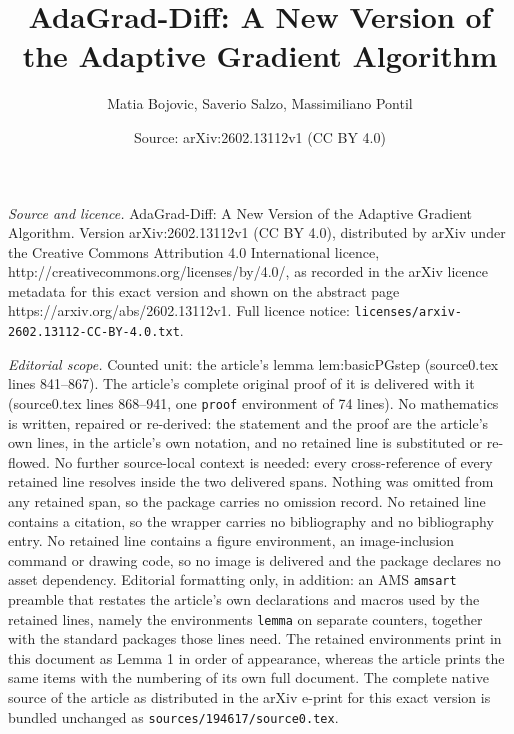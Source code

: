\documentclass[10pt,a4paper]{amsart}
\title{AdaGrad-Diff: A New Version of the Adaptive Gradient Algorithm}
\author{Matia Bojovic, Saverio Salzo, Massimiliano Pontil}
\date{Source: arXiv:2602.13112v1 (CC BY 4.0)}
\begin{document}
\maketitle

\noindent\emph{Source and licence.} AdaGrad-Diff: A New Version of the Adaptive Gradient Algorithm. Version arXiv:2602.13112v1 (CC BY 4.0), distributed by arXiv under the Creative Commons Attribution 4.0 International licence, http://creativecommons.org/licenses/by/4.0/, as recorded in the arXiv licence metadata for this exact version and shown on the abstract page https://arxiv.org/abs/2602.13112v1. Full licence notice: \texttt{licenses/arxiv-2602.13112-CC-BY-4.0.txt}.\par\smallskip

\noindent\textit{Editorial scope.} Counted unit: the article's lemma lem:basicPGstep (source0.tex lines 841--867). The article's complete original proof of it is delivered with it (source0.tex lines 868--941, one \texttt{proof} environment of 74 lines). No mathematics is written, repaired or re-derived: the statement and the proof are the article's own lines, in the article's own notation, and no retained line is substituted or re-flowed.  No further source-local context is needed: every cross-reference of every retained line resolves inside the two delivered spans.  Nothing was omitted from any retained span, so the package carries no omission record.  No retained line contains a citation, so the wrapper carries no bibliography and no bibliography entry.  No retained line contains a figure environment, an image-inclusion command or drawing code, so no image is delivered and the package declares no asset dependency.  Editorial formatting only, in addition: an AMS \texttt{amsart} preamble that restates the article's own declarations and macros used by the retained lines, namely the environments \texttt{lemma} on separate counters, together with the standard packages those lines need.  The retained environments print in this document as Lemma 1 in order of appearance, whereas the article prints the same items with the numbering of its own full document.  The complete native source of the article as distributed in the arXiv e-print for this exact version is bundled unchanged as \texttt{sources/194617/source0.tex}.
\end{document}

